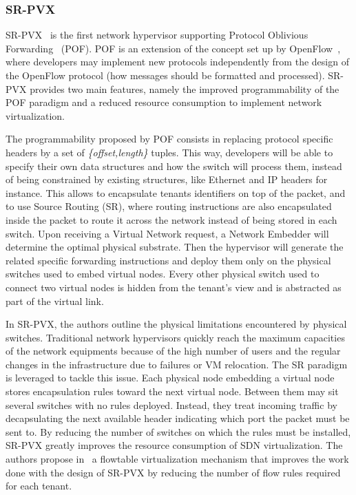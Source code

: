 \subsubsection{SR-PVX}
SR-PVX~\cite{PVX-Li2017} is the first network hypervisor supporting Protocol Oblivious Forwarding~\cite{pof-song2013} (POF). POF is an extension of the concept set up by OpenFlow~\cite{Openflow-McKeown2008}, where developers may implement new protocols independently from the design of the OpenFlow protocol (\eg how messages should be formatted and processed).
SR-PVX provides two main features, namely the improved programmability of the POF paradigm and a reduced resource consumption to implement network virtualization.

The programmability proposed by POF consists in replacing protocol specific headers by a set of \textit{\{offset,length\}} tuples. This way, developers will be able to specify their own data structures and how the switch will process them, instead of being constrained by existing structures, like Ethernet and IP headers for instance. This allows to encapsulate tenants identifiers on top of the packet, and to use Source Routing (SR), where routing instructions are also encapsulated inside the packet to route it across the network instead of being stored in each switch.
Upon receiving a Virtual Network request, a Network Embedder will determine the optimal physical substrate. Then the hypervisor will generate the related specific forwarding instructions and deploy them only on the physical switches used to embed virtual nodes. Every other physical switch used to connect two virtual nodes is hidden from the tenant's view and is abstracted as part of the virtual link.

In SR-PVX, the authors outline the physical limitations encountered by physical switches.
Traditional network hypervisors quickly reach the maximum capacities of the network equipments because of the high number of users and the regular changes in the infrastructure due to failures or VM relocation. The SR paradigm is leveraged to tackle this issue. Each physical node embedding a virtual node stores encapsulation rules toward the next virtual node. Between them may sit several switches with no rules deployed. Instead, they treat incoming traffic by decapsulating the next available header indicating which port the packet must be sent to. By reducing the number of switches on which the rules must be installed, SR-PVX greatly improves the resource consumption of SDN virtualization. The authors propose in~\cite{pvflow-Li2018} a flowtable virtualization mechanism that improves the work done with the design of SR-PVX by reducing the number of flow rules required for each tenant.
    

